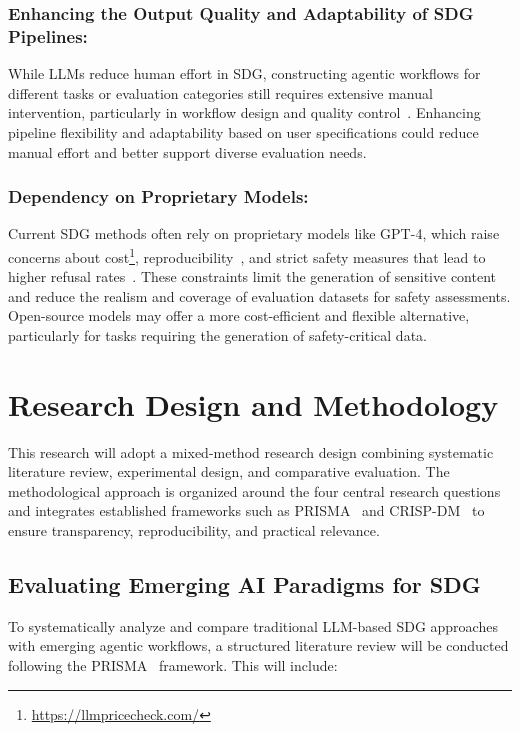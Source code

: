 \documentclass[12pt,a4paper]{article}
\begin{document}
\subsubsection{Enhancing the Output Quality and Adaptability of SDG Pipelines:} While LLMs reduce human effort in SDG, constructing agentic workflows for different tasks or evaluation categories still requires extensive manual intervention, particularly in workflow design and quality control~\cite{r4}. Enhancing pipeline flexibility and adaptability based on user specifications could reduce manual effort and better support diverse evaluation needs.

\subsubsection{Dependency on Proprietary Models:} 
Current SDG methods often rely on proprietary models like GPT-4, which raise concerns about cost\footnote{\url{https://llmpricecheck.com/}}, reproducibility~\cite{chatgpt-behavior-2,chatgpt-behavior-1}, and strict safety measures that lead to higher refusal rates~\cite{r-b8}. These constraints limit the generation of sensitive content and reduce the realism and coverage of evaluation datasets for safety assessments. Open-source models may offer a more cost-efficient and flexible alternative, particularly for tasks requiring the generation of safety-critical data.





\section{Research Design and Methodology}
This research will adopt a mixed-method research design combining systematic literature review, experimental design, and comparative evaluation. The methodological approach is organized around the four central research questions and integrates established frameworks such as PRISMA~\cite{PRISMA} and CRISP-DM~\cite{crisp} to ensure transparency, reproducibility, and practical relevance.

\subsection{Evaluating Emerging AI Paradigms for SDG}
To systematically analyze and compare traditional LLM-based SDG approaches with emerging agentic workflows, a structured literature review will be conducted following the PRISMA~\cite{PRISMA} framework. This will include: 
\end{document}
